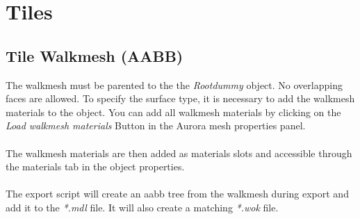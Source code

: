 \section{Tiles}

\subsection*{Tile Walkmesh (AABB)}
The walkmesh must be parented to the the {\textit{Rootdummy}} object.
No overlapping faces are allowed. To specify the surface type, it is necessary
to add the walkmesh materials to the object. You can add all walkmesh
materials by clicking on the {\textit{Load walkmesh materials}} Button in the
Aurora mesh properties panel. \\ \\

The walkmesh materials are then added as materials slots and accessible
through the materials tab in the object properties. \\ \\

The export script will create an aabb tree from the walkmesh during export
and add it to the {\textit{*.mdl}} file. It will also create a
matching {\textit{*.wok}} file.

